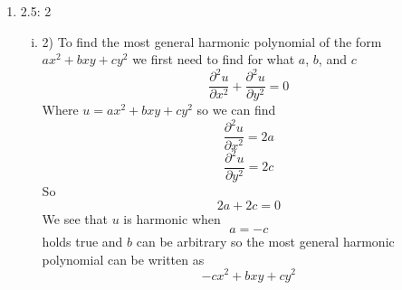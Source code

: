 \documentclass[11pt]{article}
\begin{document}
\begin{enumerate}
\item 2.5: 2
\begin{enumerate}[(i)]
\item 2)
To find the most general harmonic polynomial of the form $ax^2+bxy+cy^2$ we first need to find for what $a$, $b$, and $c$ 
$$\frac{\partial^2u}{\partial x^2}+\frac{\partial^2u}{\partial y^2}=0$$
Where $u=ax^2+bxy+cy^2$ so we can find
$$\frac{\partial^2u}{\partial x^2} = 2a$$
$$\frac{\partial^2u}{\partial y^2}= 2c$$
So
$$2a+2c=0$$
We see that $u$ is harmonic when $$a=-c$$holds true and $b$ can be arbitrary so the most general harmonic polynomial can be written as
$$-cx^2+bxy+cy^2$$
\end{enumerate}
\end{enumerate}
\end{document}

